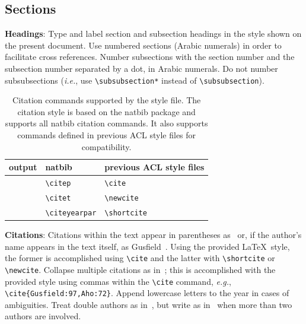 \documentclass[11pt,a4paper]{article}
\begin{document}
\subsection{Sections}

\textbf{Headings}: Type and label section and subsection headings in the
style shown on the present document.  Use numbered sections (Arabic
numerals) in order to facilitate cross references. Number subsections
with the section number and the subsection number separated by a dot, in Arabic numerals. 
Do not number subsubsections ({\em i.e.}, use \verb|\subsubsection*| instead of \verb|\subsubsection|).

\begin{table}
\centering
\begin{tabular}{lll}
  output & natbib & previous ACL style files\\
  \hline
  \citep{Gusfield:97} & \verb|\citep| & \verb|\cite| \\
  \citet{Gusfield:97} & \verb|\citet| & \verb|\newcite| \\
  \citeyearpar{Gusfield:97} & \verb|\citeyearpar| & \verb|\shortcite| \\
\end{tabular}
\caption{Citation commands supported by the style file.
  The citation style is based on the natbib package and
  supports all natbib citation commands.
  It also supports commands defined in previous ACL style files
  for compatibility.
  }
\end{table}

\textbf{Citations}: Citations within the text appear in parentheses
as~\cite{Gusfield:97} or, if the author's name appears in the text
itself, as Gusfield~.
Using the provided \LaTeX\ style, the former is accomplished using
{\verb|\cite|} and the latter with {\verb|\shortcite|} or {\verb|\newcite|}.
Collapse multiple citations as in~\cite{Gusfield:97,Aho:72}; this is accomplished with the provided style using commas within the {\verb|\cite|} command, {\em e.g.}, {\verb|\cite{Gusfield:97,Aho:72}|}.  
Append lowercase letters to the year in cases of ambiguities.  
 Treat double authors as
in~\cite{Aho:72}, but write as in~\cite{Chandra:81} when more than two
authors are involved. 
\end{document}
